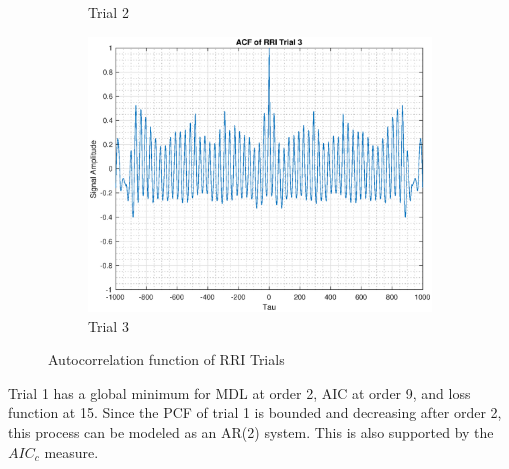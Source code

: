 \documentclass{article}
\begin{document}
\begin{figure}[h!]
\begin{subfigure}{0.32\textwidth}
\caption{Trial 2}
\label{fig:heart_acf_t2}
\end{subfigure}
\begin{subfigure}{0.32\textwidth}
\centering
\includegraphics[width = \textwidth]{heart_acf_t3}
\caption{Trial 3}
\label{fig:heart_acf_t3}
\end{subfigure}
\caption{Autocorrelation function of RRI Trials}
\label{fig:ar_heart}
\end{figure}

Trial 1 has a global minimum for MDL at order 2, AIC at order 9, and loss function at 15. Since the PCF of trial 1 is bounded and decreasing after order 2, this process can be modeled as an AR(2) system. This is also supported by the $AIC_c$ measure.\\
\end{document}
